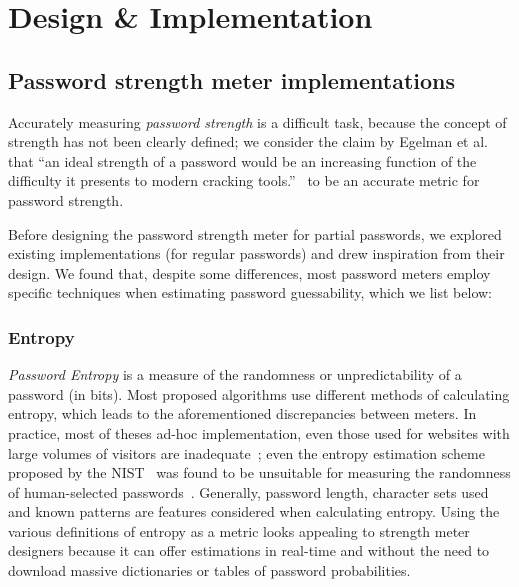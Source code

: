 
\chapter{Design \& Implementation}
\label{cha:design_implementation}

\section{Password strength meter implementations}
  \label{sec:str_meter_existing}
  Accurately measuring \emph{password strength} is a difficult task, because the concept of strength has not been clearly defined; we consider the claim by Egelman et al. that ``an ideal strength of a password would be an increasing function of the difficulty it presents to modern cracking tools.''~\cite{strength_meter_impact} to be an accurate metric for password strength.

  Before designing the password strength meter for partial passwords, we explored existing implementations (for regular passwords) and drew inspiration from their design. We found that, despite some differences, most password meters employ specific techniques when estimating password guessability, which we list below:

  \subsection{Entropy}
    \label{ssec:entropy}
    \emph{Password Entropy} is a measure of the randomness or unpredictability of a password (in bits). Most proposed algorithms use different methods of calculating entropy, which leads to the aforementioned discrepancies between meters. In practice, most of theses ad-hoc implementation, even those used for websites with large volumes of visitors are inadequate~\cite{pass_str_meter_analysis,analyzing_pass_str,dropbox_str}; even the entropy estimation scheme proposed by the NIST~\cite{NIST_old} was found to be unsuitable for measuring the randomness of human-selected passwords~\cite{NIST_invalid}. Generally, password length, character sets used and known patterns are features considered when calculating entropy. Using the various definitions of entropy as a metric looks appealing to strength meter designers because it can offer estimations in real-time and without the need to download massive dictionaries or tables of password probabilities.

